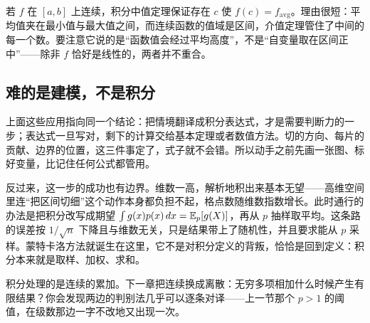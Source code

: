 若 \(f\) 在 \([a,b]\) 上连续，积分中值定理保证存在 \(c\) 使 \(f(c)=f_{\mathrm{avg}}\)。理由很短：平均值夹在最小值与最大值之间，而连续函数的值域是区间，介值定理管住了中间的每一个数。要注意它说的是``函数值会经过平均高度''，不是``自变量取在区间正中''——除非 \(f\) 恰好是线性的，两者并不重合。

\subsection{难的是建模，不是积分}

上面这些应用指向同一个结论：把情境翻译成积分表达式，才是需要判断力的一步；表达式一旦写对，剩下的计算交给基本定理或者数值方法。切的方向、每片的贡献、边界的位置，这三件事定了，式子就不会错。所以动手之前先画一张图、标好变量，比记住任何公式都管用。

反过来，这一步的成功也有边界。维数一高，解析地积出来基本无望——高维空间里连``把区间切细''这个动作本身都负担不起，格点数随维数指数增长。此时通行的办法是把积分改写成期望 \(\int g(x)p(x)\,dx=\mathbb{E}_p[g(X)]\)，再从 \(p\) 抽样取平均。这条路的误差按 \(1/\sqrt n\) 下降且与维数无关，只是结果带上了随机性，并且要求能从 \(p\) 采样。蒙特卡洛方法就诞生在这里，它不是对积分定义的背叛，恰恰是回到定义：积分本来就是取样、加权、求和。

积分处理的是连续的累加。下一章把连续换成离散：无穷多项相加什么时候产生有限结果？你会发现两边的判别法几乎可以逐条对译——上一节那个 \(p>1\) 的阈值，在级数那边一字不改地又出现一次。
